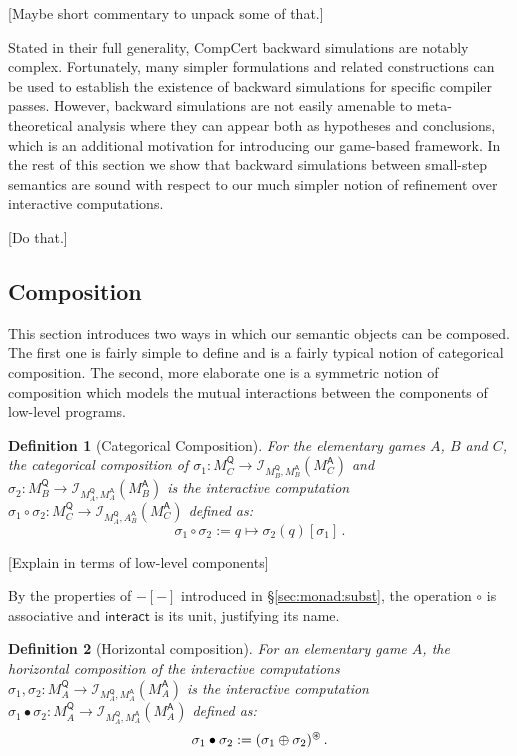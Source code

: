 \documentclass{article}
\newtheorem{definition}{Definition}
\newcommand{\kw}[1]{\ensuremath{ \mathsf{#1} }}
\begin{document}
[Maybe short commentary to unpack some of that.]

Stated in their full generality,
CompCert backward simulations are notably complex.
Fortunately,
many simpler formulations and related constructions
can be used to establish
the existence of backward simulations
for specific compiler passes.
However,
backward simulations are not easily amenable to
meta-theoretical analysis
where they can appear both as hypotheses and conclusions,
which is an additional motivation for introducing
our game-based framework.
In the rest of this section we show that
backward simulations between small-step semantics
are sound with respect to
our much simpler notion of refinement
over interactive computations.

[Do that.]


\subsection{Composition} \label{sec:modsem:comp} %

This section introduces two ways in which
our semantic objects can be composed.
The first one is fairly simple to define
and is a fairly typical notion of categorical composition.
The second, more elaborate one
is a symmetric notion of composition which
models the mutual interactions
between the components of low-level programs.

\begin{definition}[Categorical Composition]
For the elementary games $A$, $B$ and $C$,
the \emph{categorical composition} of
$\sigma_1 : M_C^\kw{Q} \rightarrow
 \mathcal{I}_{M_B^\kw{Q},M_B^\kw{A}}(M_C^\kw{A})$ and
$\sigma_2 : M_B^\kw{Q} \rightarrow
 \mathcal{I}_{M_A^\kw{Q},M_A^\kw{A}}(M_B^\kw{A})$
is the interactive computation
$\sigma_1 \circ \sigma_2 : M_C^\kw{Q} \rightarrow
 \mathcal{I}_{M_A^\kw{Q},A_B^\kw{A}}(M_C^\kw{A})$
defined as:
\[
    \sigma_1 \circ \sigma_2 := q \mapsto \sigma_2(q)[\sigma_1] \,.
\]
\end{definition}

[Explain in terms of low-level components]

By the properties of $-[-]$ introduced in \S\ref{sec:monad:subst},
the operation $\circ$ is associative and
$\kw{interact}$ is its unit,
justifying its name.

\begin{definition}[Horizontal composition]
For an elementary game $A$,
the \emph{horizontal composition} of the interactive computations
$\sigma_1, \sigma_2 : M_A^\kw{Q} \rightarrow
 \mathcal{I}_{M_A^\kw{Q},M_A^\kw{A}}(M_A^\kw{A})$
is the interactive computation
$\sigma_1 \bullet \sigma_2 : M_A^\kw{Q} \rightarrow
 \mathcal{I}_{M_A^\kw{Q},M_A^\kw{A}}(M_A^\kw{A})$
defined as:
\[
    \sigma_1 \bullet \sigma_2 :=
      (\sigma_1 \oplus \sigma_2)^\oast \,.
\]
\end{definition}
\end{document}
